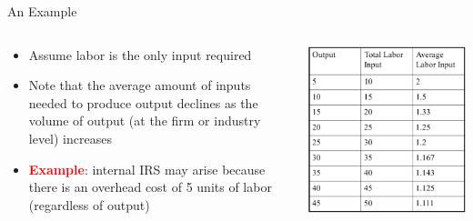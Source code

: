 \documentclass[10pt,hyperref={CJKbookmarks=true},xcolor=dvipsnames,aspectratio=169]{beamer}
\begin{document}
\begin{frame}{An Example}


\begin{columns}[onlytextwidth]
\begin{column}{0.5\textwidth}
\begin{itemize}
\item Assume labor is the only input required 
\item Note that the average amount of inputs needed to produce output declines
as the volume of output (at the firm or industry level) increases 
\item \textbf{\textcolor{red}{Example}}: internal IRS may arise because
there is an overhead cost of 5 units of labor (regardless of output) 
\end{itemize}

\end{column}
\begin{column}{0.5\textwidth}
\includegraphics[width=0.9\columnwidth]{fig/krugman/lec6-4}
\end{column}
\end{columns}

\end{frame}
\end{document}
